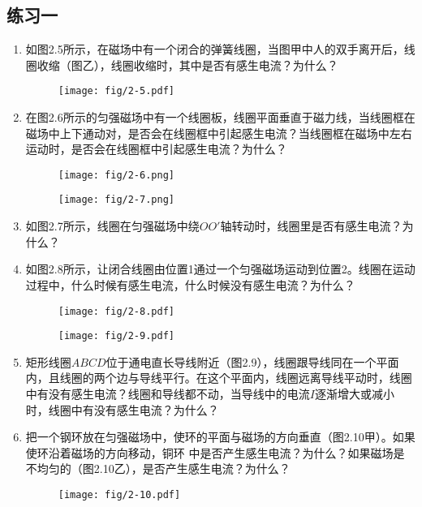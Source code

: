 \subsection*{练习一}
\begin{enumerate}
    \item 如图2.5所示，在磁场中有一个闭合的弹簧线圈，当图甲中人的双手离开后，线圈收缩（图乙），线圈收缩时，其中是否有感生电流？为什么？
\begin{figure}[htp]\centering
\texttt{[image: fig/2-5.pdf]}
\caption{}
\end{figure}

    \item 在图2.6所示的匀强磁场中有一个线圈板，线圈平面垂直于磁力线，当线圈框在磁场中上下通动对，是否会在线圈框中引起感生电流？当线圈框在磁场中左右运动时，是否会在线圈框中引起感生电流？为什么？
\begin{figure}[htp]
\centering
\begin{minipage}[t]{0.48\textwidth}
\centering
\texttt{[image: fig/2-6.png]}
\caption{}
\end{minipage}
\begin{minipage}[t]{0.48\textwidth}
\centering
\texttt{[image: fig/2-7.png]}
\caption{}
\end{minipage}
\end{figure}

    \item 如图2.7所示，线圈在匀强磁场中绕$OO'$轴转动时，线圈里是否有感生电流？为什么？
    \item 如图2.8所示，让闭合线圈由位置1通过一个匀强磁场运动到位置2。线圈在运动过程中，什么时候有感生电流，什么时候没有感生电流？为什么？
\begin{figure}[htp]
\centering
\begin{minipage}[t]{0.48\textwidth}
\centering
\texttt{[image: fig/2-8.pdf]}
\caption{}
\end{minipage}
\begin{minipage}[t]{0.48\textwidth}
\centering
\texttt{[image: fig/2-9.pdf]}
\caption{}
\end{minipage}
\end{figure}


    \item 矩形线圈$ABCD$位于通电直长导线附近（图2.9），线圈跟导线同在一个平面内，且线圈的两个边与导线平行。在这个平面内，线圈远离导线平动时，线圈中有没有感生电流？线圈和导线都不动，当导线中的电流$I$逐渐增大或减小时，线圈中有没有感生电流？为什么？
    \item 把一个钢环放在匀强磁场中，使环的平面与磁场的方向垂直（图2.10甲）。如果使环沿着磁场的方向移动，铜环
中是否产生感生电流？为什么？如果磁场是不均匀的（图2.10乙），是否产生感生电流？为什么？
\begin{figure}[htp]\centering
\texttt{[image: fig/2-10.pdf]}
\caption{}
\end{figure}
\end{enumerate}


